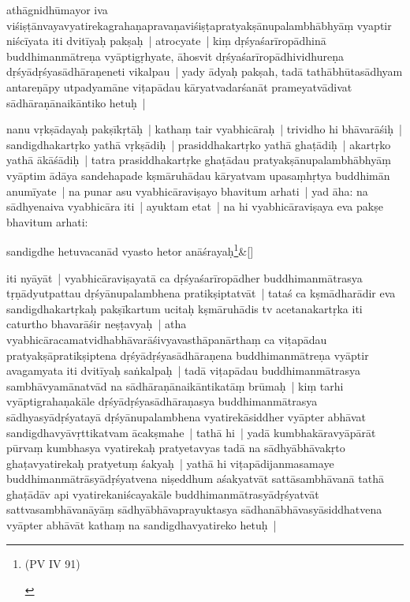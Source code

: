 \documentclass[article,a4paper]{memoir}
\begin{document}
	  
	

	  \pstart athā\-gnidhū\-mayor iva viśiṣṭā\-nvayavyatirekagrahaṇapravaṇaviśiṣṭapratyakṣā\-nupalambhā\-bhyā\-ṃ vyaptir niścī\-yata iti dvitī\-yaḥ pakṣaḥ | atrocyate | kiṃ dṛśyaśarī\-ropā\-dhinā\- buddhimanmā\-treṇa vyā\-ptigṛhyate, ā\-hosvit dṛśyaśarī\-ropā\-dhividhureṇa dṛśyā\-dṛśyasā\-dhā\-raṇeneti vikalpau | yady ā\-dyaḥ pakṣah, tadā\- tathā\-bhū\-tasā\-dhyam antareṇā\-py utpadyamā\-ne viṭapā\-dau kā\-ryatvadarśanā\-t prameyatvā\-divat sā\-dhā\-raṇā\-naikā\-ntiko hetuḥ |
	\pend
      

	  \pstart {}\label{thakur75-44.2} nanu vṛkṣā\-dayaḥ pakṣī\-kṛtā\-ḥ | kathaṃ tair vyabhicā\-raḥ | trividho hi bhā\-varā\-śiḥ | sandigdhakartṛko yathā\- vṛkṣā\-diḥ | prasiddhakartṛko yathā\- ghaṭā\-diḥ | akartṛko yathā\- ā\-kā\-śā\-diḥ | tatra prasiddhakartṛke ghaṭā\-dau pratyakṣā\-nupalambhā\-bhyā\-ṃ vyā\-ptim ā\-dā\-ya sandehapade kṣmā\-ruhā\-dau kā\-ryatvam upasaṃhṛtya buddhimā\-n anumī\-yate | na punar asu vyabhicā\-raviṣayo bhavitum arhati | \label{thakur75-44.8} yad ā\-ha: na sā\-dhyenaiva vyabhicā\-ra iti | ayuktam etat | na hi vyabhicā\-raviṣaya eva pakṣe bhavitum arhati:
	\pend
      
	    
	    \stanza[\smallbreak]
sandigdhe hetuvacanā\-d vyasto hetor anā\-śrayaḥ\footnote{\begin{english}(PV IV 91)\end{english}}\&[\smallbreak]


	

	  \pstart iti nyā\-yā\-t | vyabhicā\-raviṣayatā\- ca dṛśyaśarī\-ropā\-dher buddhimanmā\-trasya tṛṇā\-dyutpattau dṛśyā\-nupalambhena pratikṣiptatvā\-t | tataś ca kṣmā\-dharā\-dir eva sandigdhakartṛkaḥ pakṣī\-kartum ucitaḥ kṣmā\-ruhā\-dis tv acetanakartṛka iti caturtho bhavarā\-śir neṣṭavyaḥ | atha vyabhicā\-racamatvidhabhā\-varā\-śivyavasthā\-panā\-rthaṃ ca viṭapā\-dau pratyakṣā\-pratikṣiptena dṛśyā\-dṛśyasā\-dhā\-raṇena buddhimanmā\-treṇa vyā\-ptir avagamyata iti dvitī\-yaḥ saṅkalpaḥ | tadā\- viṭapā\-dau buddhimanmā\-trasya sambhā\-vyamā\-natvā\-d na sā\-dhā\-raṇā\-naikā\-ntikatā\-ṃ brū\-maḥ | kiṃ tarhi vyā\-ptigrahaṇakā\-le dṛśyā\-dṛśyasā\-dhā\-raṇasya buddhimanmā\-trasya sā\-dhyasyā\-dṛśyatayā\- dṛśyā\-nupalambhena vyatirekā\-siddher vyā\-pter abhā\-vat sandigdhavyā\-vṛttikatvam ā\-cakṣmahe | tathā\- hi | yadā\- kumbhakā\-ravyā\-pā\-rā\-t pū\-rvaṃ kumbhasya vyatirekaḥ pratyetavyas tadā\- na sā\-dhyā\-bhā\-vakṛto ghaṭavyatirekaḥ pratyetuṃ śakyaḥ | yathā\- hi viṭapā\-dijanmasamaye buddhimanmā\-trā\-syā\-dṛśyatvena niṣeddhum aśakyatvā\-t sattā\-sambhā\-vanā\- tathā\- ghaṭā\-dā\-v api vyatirekaniścayakā\-le buddhimanmā\-trasyā\-dṛśyatvā\-t sattvasambhā\-vanā\-yā\-ṃ sā\-dhyā\-bhā\-vaprayuktasya sā\-dhanā\-bhā\-vasyā\-siddhatvena vyā\-pter abhā\-vā\-t kathaṃ na sandigdhavyatireko hetuḥ |
	\pend
      
\end{document}
